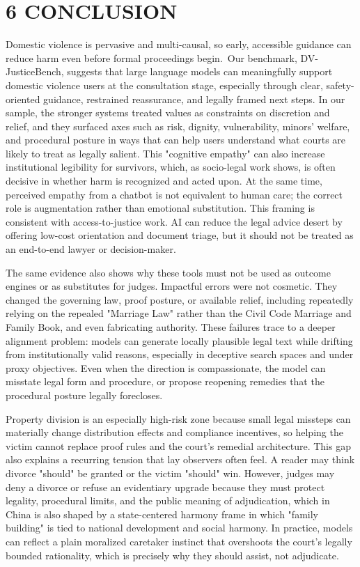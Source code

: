 \hypertarget{conclusion}{%
\section{\texorpdfstring{\textbf{6 CONCLUSION}}{6 CONCLUSION}}\label{conclusion}}

Domestic violence is pervasive and multi-causal, so early, accessible guidance can reduce harm even before formal proceedings begin.~Our benchmark, DV-JusticeBench, suggests that large language models can meaningfully support domestic violence users at the consultation stage, especially through clear, safety-oriented guidance, restrained reassurance, and legally framed next steps. In our sample, the stronger systems treated values as constraints on discretion and relief, and they surfaced axes such as risk, dignity, vulnerability, minors' welfare, and procedural posture in ways that can help users understand what courts are likely to treat as legally salient. This "cognitive empathy" can also increase institutional legibility for survivors, which, as socio-legal work shows, is often decisive in whether harm is recognized and acted upon. At the same time, perceived empathy from a chatbot is not equivalent to human care; the correct role is augmentation rather than emotional substitution. This framing is consistent with access-to-justice work. AI can reduce the legal advice desert by offering low-cost orientation and document triage, but it should not be treated as an end-to-end lawyer or decision-maker.

The same evidence also shows why these tools must not be used as outcome engines or as substitutes for judges. Impactful errors were not cosmetic. They changed the governing law, proof posture, or available relief, including repeatedly relying on the repealed "Marriage Law" rather than the Civil Code Marriage and Family Book, and even fabricating authority. These failures trace to a deeper alignment problem: models can generate locally plausible legal text while drifting from institutionally valid reasons, especially in deceptive search spaces and under proxy objectives. Even when the direction is compassionate, the model can misstate legal form and procedure, or propose reopening remedies that the procedural posture legally forecloses.

Property division is an especially high-risk zone because small legal missteps can materially change distribution effects and compliance incentives, so helping the victim cannot replace proof rules and the court's remedial architecture. This gap also explains a recurring tension that lay observers often feel. A reader may think divorce "should" be granted or the victim "should" win. However, judges may deny a divorce or refuse an evidentiary upgrade because they must protect legality, procedural limits, and the public meaning of adjudication, which in China is also shaped by a state-centered harmony frame in which "family building" is tied to national development and social harmony. In practice, models can reflect a plain moralized caretaker instinct that overshoots the court's legally bounded rationality, which is precisely why they should assist, not adjudicate.


